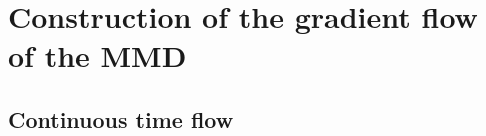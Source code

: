 \section{Construction of the gradient flow of the MMD}

\subsection{Continuous time flow}


%

%
%



